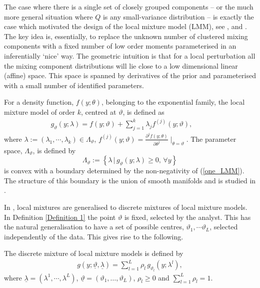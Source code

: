 \documentclass[graybox]{svmult}
\begin{document}
The case where there is a  single  set of  closely grouped components -- or the  much more general situation where $Q$ is
any small-variance  distribution  -- is exactly the case which motivated  the design of the local mixture model (LMM),  see \cite{Marriott2002},
and \cite{Anaya-Izquierdo2007}. The key idea is, essentially,  to  replace the unknown number of clustered mixing components with a fixed number of low order moments parameterised in an inferentially  `nice' way.   The geometric  intuition is that for  a local perturbation all the mixing component distributions will lie close to a low dimensional linear (affine)  space. This space is  spanned by derivatives of the prior and parameterised with a small number of identified parameters.
\begin{definition}\label{Definition 1}
For a density function,  $f(y;\theta)$, belonging to the exponential family, the local mixture model of order $k$, centred at $\vartheta$, is defined as
\begin{eqnarray}
g_{\vartheta}(y;\lambda)=f(y;\vartheta)+\sum\nolimits_{j=1}^k \lambda_j f^{(j)}(y;\vartheta),\hspace{1cm}
\label{one_LMM}
\end{eqnarray}
where $\lambda := (\lambda_1,\cdots,\lambda_k) \in \Lambda_{\vartheta}$, $f^{(j)}(y;\vartheta)=\frac{\partial^j f(y;\theta)}{\partial \theta^j}
\mid_{\theta=\vartheta} $. The parameter space, $\Lambda_{\vartheta}$, is defined by
$$
\Lambda_{\vartheta} := \left\{ \lambda \,|\, g_{\vartheta}(y;\lambda) \ge 0, \,\forall y \right\}
$$
is  convex   with a  boundary determined by the non-negativity of (\ref{one_LMM}). The structure of this boundary is the union of smooth manifolds and is studied in \cite{Maroufy2015}.
\end{definition}
 In \cite{Maroufy2016a}, local mixtures  are 
generalised to  discrete mixtures of
local mixture models.   In Definition \ref{Definition 1} the point $\vartheta$ is fixed, selected by the analyst. This has the natural generalisation to have a set of possible centres,   $\vartheta_1,\cdots\vartheta_L$,   selected independently of the data. This gives rise to the following.
\begin{definition}\label{Definition 2}
The discrete mixture of local mixture
models is defined by
\begin{eqnarray}
g(y;\underline{\vartheta},\underline{\lambda})=\sum\nolimits_{l=1}^L \rho_l\, g_{\vartheta_l}(y;\lambda^l), \label{DMLMM}
\end{eqnarray}
where  $\underline{\lambda}=(\lambda^1,\cdots,\lambda^L)$, $\underline{\vartheta} =( \vartheta_1, \dots, \vartheta_L)$, $\rho_l\geq 0$ and $\sum_{l=1}^{L}\rho_l=1$.
 \end{definition}
\end{document}
